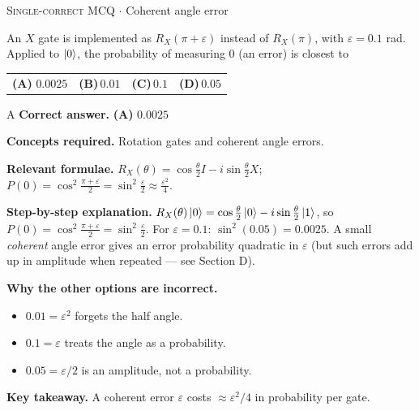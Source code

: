 \documentclass[11pt,a4paper]{article}
\newcommand{\optlabel}[1]{\textbf{(#1)}}
\newcommand{\correctlabel}[1]{\textcolor{okgreen}{\textbf{(#1)}\,\ding{51}}}
\newenvironment{qitem}[1]{\begin{list}{}{\setlength{\leftmargin}{3.3em}\setlength{\labelwidth}{3.1em}%
  \setlength{\labelsep}{0.2em}\setlength{\topsep}{3pt}\setlength{\parsep}{3pt}}\item[\textbf{Q.#1}\hfill]}{\end{list}}
\newcommand{\qsep}{\par\vspace{2pt}{\color{black!15}\hrule}\vspace{4pt}}
\newcommand{\qmeta}[2]{{\footnotesize\color{black!60}\textsc{#1} \;$\cdot$\; #2}\par}
\begin{document}
\begin{qitem}{9}
\qmeta{Single-correct MCQ}{Coherent angle error}
An $X$ gate is implemented as $R_X(\pi + \varepsilon)$ instead of $R_X(\pi)$, with $\varepsilon = 0.1$ rad. Applied to $\ket0$, the
probability of measuring $0$ (an error) is closest to
\par\smallskip\noindent\begin{tabularx}{\linewidth}{@{}*{4}{L}@{}}
\correctlabel{A}\,$0.0025$ & \optlabel{B}\,$0.01$ & \optlabel{C}\,$0.1$ & \optlabel{D}\,$0.05$
\end{tabularx}
\end{qitem}
\begin{solbox}{A}
\textbf{\color{brand}Correct answer.} \textcolor{okgreen}{\textbf{(A)}} $0.0025$

\textbf{\color{brand}Concepts required.} Rotation gates and coherent angle errors.

\textbf{\color{brand}Relevant formulae.} $R_X(\theta) = \cos\frac\theta2I - i\sin\frac\theta2X$; $P(0) = \cos^2\frac{\pi + \varepsilon}{2} = \sin^2\frac\varepsilon2 \approx \frac{\varepsilon^2}{4}$.

\textbf{\color{brand}Step-by-step explanation.} $R_X(\theta)\ket0 = \cos\frac\theta2\ket0 - i\sin\frac\theta2\ket1$, so $P(0) = \cos^2\frac{\pi + \varepsilon}{2} = \sin^2\frac\varepsilon2$.
For $\varepsilon = 0.1$: $\sin^2(0.05) = 0.0025$. A small \emph{coherent} angle error gives an error probability quadratic in $\varepsilon$
(but such errors add up in amplitude when repeated --- see Section D).

\textbf{\color{brand}Why the other options are incorrect.}
\begin{itemize}[leftmargin=2.4em, itemsep=1pt, topsep=2pt]
\item[\textbf{(B)}] $0.01 = \varepsilon^2$ forgets the half angle.
\item[\textbf{(C)}] $0.1 = \varepsilon$ treats the angle as a probability.
\item[\textbf{(D)}] $0.05 = \varepsilon/2$ is an amplitude, not a probability.
\end{itemize}
\textbf{\color{brand}Key takeaway.} A coherent error $\varepsilon$ costs $\approx\varepsilon^2/4$ in probability per gate.
\end{solbox}
\qsep
\end{document}
